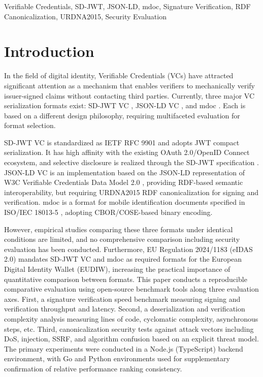 \documentclass[conference]{IEEEtran}
\begin{document}
\begin{IEEEkeywords}
Verifiable Credentials, SD-JWT, JSON-LD, mdoc, Signature Verification, RDF Canonicalization, URDNA2015, Security Evaluation
\end{IEEEkeywords}

\section{Introduction}

In the field of digital identity, Verifiable Credentials (VCs) have attracted significant attention as a mechanism that enables verifiers to mechanically verify issuer-signed claims without contacting third parties. Currently, three major VC serialization formats exist: SD-JWT VC \cite{ref1}, JSON-LD VC \cite{ref2}, and mdoc \cite{ref3}. Each is based on a different design philosophy, requiring multifaceted evaluation for format selection.

SD-JWT VC is standardized as IETF RFC 9901 and adopts JWT compact serialization. It has high affinity with the existing OAuth 2.0/OpenID Connect ecosystem, and selective disclosure is realized through the SD-JWT specification \cite{ref7}. JSON-LD VC is an implementation based on the JSON-LD representation of W3C Verifiable Credentials Data Model 2.0 \cite{ref2}, providing RDF-based semantic interoperability, but requiring URDNA2015 RDF canonicalization \cite{ref4} for signing and verification. mdoc is a format for mobile identification documents specified in ISO/IEC 18013-5 \cite{ref3}, adopting CBOR/COSE-based binary encoding.

However, empirical studies comparing these three formats under identical conditions are limited, and no comprehensive comparison including security evaluation has been conducted. Furthermore, EU Regulation 2024/1183 (eIDAS 2.0) \cite{ref18} mandates SD-JWT VC and mdoc as required formats for the European Digital Identity Wallet (EUDIW), increasing the practical importance of quantitative comparison between formats. This paper conducts a reproducible comparative evaluation using open-source benchmark tools along three evaluation axes. First, a signature verification speed benchmark measuring signing and verification throughput and latency. Second, a deserialization and verification complexity analysis measuring lines of code, cyclomatic complexity, asynchronous steps, etc. Third, canonicalization security tests against attack vectors including DoS, injection, SSRF, and algorithm confusion based on an explicit threat model. The primary experiments were conducted in a Node.js (TypeScript) backend environment, with Go and Python environments used for supplementary confirmation of relative performance ranking consistency.
\end{document}
